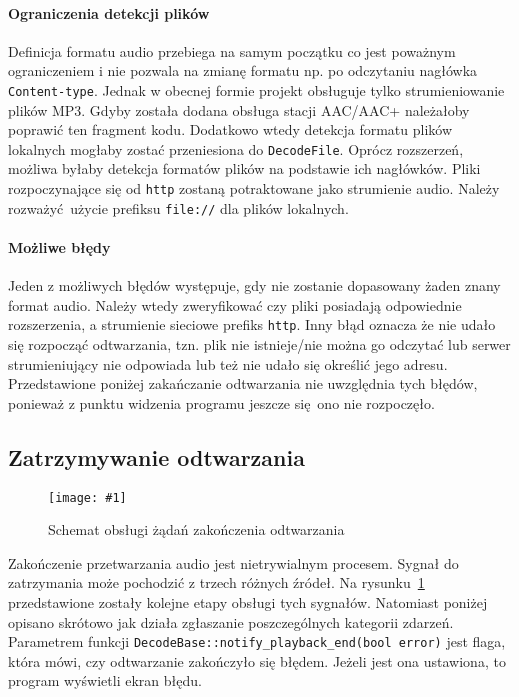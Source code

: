 \documentclass[12pt]{report}
\newcommand{\imgint}[4]{
	\begin{figure}[{#4}]
		\centering
		\texttt{[image: \#1]}
		\caption{#2}
		\label{#1}
	\end{figure}
}
\newcommand{\imgcs}[3]{\imgint{#1}{#2}{#3}{}}
\begin{document}
			\paragraph{Ograniczenia detekcji plików}
				Definicja formatu audio przebiega na samym początku co jest poważnym ograniczeniem i nie pozwala na zmianę formatu np. po odczytaniu nagłówka \lstinline|Content-type|. Jednak w obecnej formie projekt obsługuje tylko strumieniowanie plików MP3. Gdyby została dodana obsługa stacji AAC/AAC+ należałoby poprawić ten fragment kodu. Dodatkowo wtedy detekcja formatu plików lokalnych mogłaby zostać przeniesiona do \lstinline|DecodeFile|. Oprócz rozszerzeń, możliwa byłaby detekcja formatów plików na podstawie ich nagłówków. Pliki rozpoczynające się od \lstinline|http| zostaną potraktowane jako strumienie audio. Należy rozważyć użycie prefiksu \lstinline|file://| dla plików lokalnych.
			
			\paragraph{Możliwe błędy}
				Jeden z możliwych błędów występuje, gdy nie zostanie dopasowany żaden znany format audio. Należy wtedy zweryfikować czy pliki posiadają odpowiednie rozszerzenia, a strumienie sieciowe prefiks \lstinline|http|. Inny błąd oznacza że nie udało się rozpocząć odtwarzania, tzn. plik nie istnieje/nie można go odczytać lub serwer strumieniujący nie odpowiada lub też nie udało się określić jego adresu. Przedstawione poniżej zakańczanie odtwarzania nie uwzględnia tych błędów, ponieważ z punktu widzenia programu jeszcze się ono nie rozpoczęło.
		
		\subsection{Zatrzymywanie odtwarzania}
			\imgcs{3/PicoRadio-stop}{Schemat obsługi żądań zakończenia odtwarzania}{1}
			Zakończenie przetwarzania audio jest nietrywialnym procesem. Sygnał do zatrzymania może pochodzić z trzech różnych źródeł. Na rysunku~\ref{3/PicoRadio-stop} przedstawione zostały kolejne etapy obsługi tych sygnałów. Natomiast poniżej opisano skrótowo jak działa zgłaszanie poszczególnych kategorii zdarzeń. 
			$ $\\
			
			Parametrem funkcji \lstinline|DecodeBase::notify_playback_end(bool error)| jest flaga, która mówi, czy odtwarzanie zakończyło się błędem. Jeżeli jest ona ustawiona, to program wyświetli ekran błędu.
			
\end{document}
